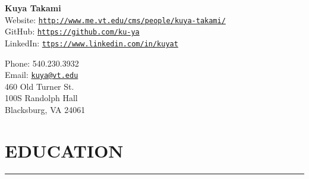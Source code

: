 \documentclass[12pt,letterpaper]{article}
\def\name{\bf Kuya Takami}
\begin{document}

\begin{minipage}{0.7\linewidth}
\vspace{-6mm}
\hspace{5mm}
{\Huge \name}\\

\vspace{0mm}\hspace{7mm}
Website:  \href{http://www.me.vt.edu/cms/people/kuya-takami/}{\tt http://www.me.vt.edu/cms/people/kuya-takami/} \\
\hspace{7mm}
GitHub: \href{https://github.com/ku-ya}{\tt https://github.com/ku-ya}\\
\hspace{7mm}
LinkedIn:  \href{https://www.linkedin.com/in/kuyat}{\tt ttps://www.linkedin.com/in/kuyat} \\
\end{minipage}
\begin{minipage}{0.6\linewidth} 
      Phone:  540.230.3932\\
	Email:  \href{mailto:kuya@vt.edu}{\tt kuya@vt.edu} \\
    460 Old Turner St.\\
  100S Randolph Hall\\
   Blacksburg, VA 24061\\
\end{minipage}
\vspace{-10mm}
\section*{EDUCATION}
\vspace{-2mm}
\hrule
\end{document}
